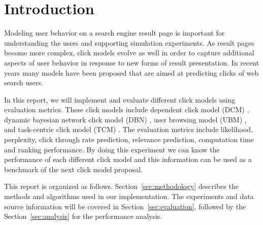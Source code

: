 \section{Introduction}
Modeling user behavior on a search engine result page is important for understanding the users and supporting simulation experiments.
As result pages become more complex, click models evolve as well in order to capture additional aspects of user behavior in response to new forms of result presentation.
In recent years many models have been proposed that are aimed at predicting clicks of web search users. 

In this report, we will implement and evaluate different click models using evaluation metrics.
These click models include dependent click model (DCM) \cite{Guo2009}, dynamic bayesian network click model (DBN) \cite{Chapelle2009}, user browsing model (UBM) \cite{Dupret2008}, and task-centric click model (TCM) \cite{Zhang2011}.
The evaluation metrics include likelihood, perplexity, click through rate prediction, relevance prediction, computation time and ranking performance.
By doing this experiment we can know the performance of each different click model and this information can be used as a benchmark of the next click model proposal.

This report is organized as follows.
Section~\ref{sec:methodology} describes the methods and algorithms used in our implementation.
The experiments and data source information will be covered in Section~\ref{sec:evaluation}, followed by the Section~\ref{sec:analysis} for the performance analysis.